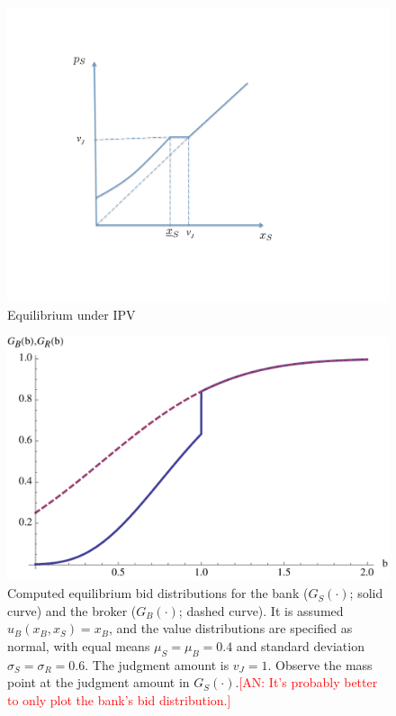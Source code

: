 \documentclass[11pt,twopage]{article}
\newcommand{\AN}[1]{\textcolor{red}{[AN: #1]}}
\begin{document}
%
\begin{figure}[t]
\centering
\includegraphics[scale=0.55]{graphics/equilibrium.pdf}
\caption{Equilibrium under IPV\label{fig:equilibrium}}
\end{figure}

\begin{figure}[t]
\centering
\includegraphics[scale = 0.5]{graphics/model_equilibrium}
\caption{Computed 
	equilibrium bid distributions for the bank
  ($G_S(\cdot)$; solid curve) and the broker ($G_B(\cdot)$; dashed
  curve). It is assumed $u_B(x_B,x_S) = x_B$, and the value distributions are specified as normal, with equal
  means $\mu_S = \mu_B = 0.4$ and standard deviation $\sigma_S =
  \sigma_R = 0.6$. The judgment amount is $v_J=1$. Observe the mass
  point at the judgment amount in
  $G_S(\cdot)$.\AN{It's probably better to only plot the bank's bid distribution.}\label{fig:model_equilibrium}}
\end{figure}
\end{document}
